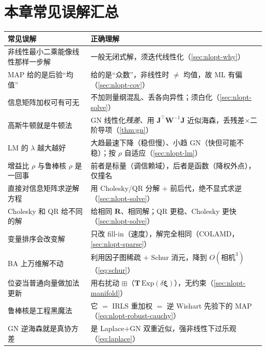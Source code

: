 \section*{本章常见误解汇总}
\begin{table}[H]\centering\small
\begin{tabular}{p{} p{}}
\toprule
\textbf{常见误解} & \textbf{正确理解} \\
\midrule
非线性最小二乘能像线性那样一步解 & 一般无闭式解，须迭代线性化（\cref{sec:nlopt-why}）\\
MAP 给的是后验“均值” & 给的是“众数”，非线性时 $\ne$ 均值，故 ML 有偏（\cref{sec:nlopt-cov}）\\
信息矩阵加权可有可无 & 不加则量纲混乱、丢各向异性；须白化（\cref{sec:nlopt-solve}）\\
高斯牛顿就是牛顿法 & GN 线性化\emph{残差}、用 $\mathbf{J}^\top\mathbf{W}^{-1}\mathbf{J}$ 近似海森，丢残差$\times$二阶导项（\cref{thm:gn}）\\
LM 的 $\lambda$ 越大越好 & 大趋最速下降（稳但慢）、小趋 GN（快但可能不稳）；按 $\rho$ 自适应（\cref{sec:nlopt-lm}）\\
增益比 $\rho$ 与鲁棒核 $\rho$ 是一回事 & 前者是标量（调信赖域），后者是函数（降权外点），仅撞名 \\
直接对信息矩阵求逆解方程 & 用 Cholesky/QR 分解 $+$ 前后代，绝不显式求逆（\cref{sec:nlopt-solve}）\\
Cholesky 和 QR 给不同的解 & 给相同 $\mathbf{R}$、相同解；QR 更稳、Cholesky 更快（\cref{sec:nlopt-solve}）\\
变量排序会改变解 & 只改 fill-in（速度），解完全相同（COLAMD，\cref{sec:nlopt-sparse}）\\
BA 上万维解不动 & 利用因子图稀疏 $+$ Schur 消元，降到 $O(\text{相机}^3)$（\cref{eq:schur}）\\
位姿当普通向量做加法更新 & 用右扰动 $\boxplus$（$\mathbf{T}\,\mathrm{Exp}(\delta\boldsymbol{\xi})$），无约束（\cref{sec:nlopt-manifold}）\\
鲁棒核是工程黑魔法 & 它 $=$ IRLS 重加权 $=$ 逆 Wishart 先验下的 MAP（\cref{eq:nlopt-robust-cauchy}）\\
GN 逆海森就是真协方差 & 是 Laplace$+$GN 双重近似，强非线性下过乐观（\cref{eq:laplace}）\\
\bottomrule
\end{tabular}
\end{table}

